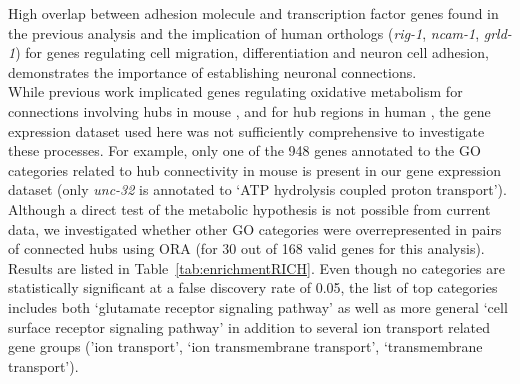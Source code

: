 \documentclass[10pt,letterpaper]{article}
\begin{document}
{High overlap between adhesion molecule and transcription factor genes found in the previous analysis and the implication of human orthologs (\emph{rig-1}, \emph{ncam-1}, \emph{grld-1}) \cite{Harris:2009kd} for genes regulating cell migration, differentiation and neuron cell adhesion, demonstrates the importance of establishing neuronal connections.\\
While previous work implicated genes regulating oxidative metabolism for connections involving hubs in mouse \cite{Fulcher:2016ck}, and for hub regions in human \cite{Vertes2016a}, the gene expression dataset used here was not sufficiently comprehensive to investigate these processes.
For example, only one of the 948 genes annotated to the GO categories related to hub connectivity in mouse is present in our gene expression dataset (only \emph{unc-32} is annotated to `ATP hydrolysis coupled proton transport').
Although a direct test of the metabolic hypothesis is not possible from current data, we investigated whether other GO categories were overrepresented in pairs of connected hubs using ORA (for 30 out of 168 valid genes for this analysis).
Results are listed in Table~\ref{tab:enrichmentRICH}.
Even though no categories are statistically significant at a false discovery rate of 0.05, the list of top categories includes both `glutamate receptor signaling pathway' as well as more general `cell surface receptor signaling pathway' in addition to several ion transport related gene groups ('ion transport', `ion transmembrane transport', `transmembrane transport').  
}
\end{document}
